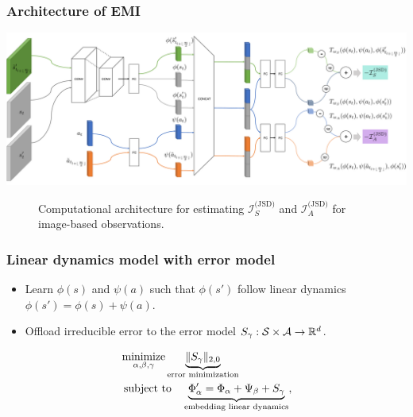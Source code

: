 \documentclass[10pt,mathserif]{beamer}
\begin{document}

\begin{frame}
\frametitle{Architecture of EMI}
  \vspace{2em}
  \hspace*{-2em} \includegraphics[width=0.95\paperwidth]{emi_figures/arch_diagram}
  \vspace{-1em}
  \begin{figure}
      \caption{Computational architecture for estimating $\mathcal{I}^{\text{(JSD)}}_S$ and $\mathcal{I}^{\text{(JSD)}}_A$ for image-based observations.}
  \end{figure}

\end{frame}


\begin{frame}
\frametitle{Linear dynamics model with error model}
\begin{itemize} \itemsep=12pt
\item Learn $\phi(s)$ and $\psi(a)$ such that $\phi(s')$ follow linear dynamics \ie~ $\phi(s') = \phi(s) + \psi(a)$.
\item Offload irreducible error to the error model $S_\gamma : \mathcal{S} \times \mathcal{A} \rightarrow \mathbb R^d$.
\end{itemize}

\begin{align}
&\operatorname*{minimize}_{\alpha, \beta, \gamma} \underbrace{\| S_\gamma \|_{2,0}}_{\text{error minimization}} \nonumber\\
&\text{\ subject to }~~ \underbrace{\Phi_{\alpha}' = \Phi_\alpha + \Psi_\beta + S_\gamma}_{\text{embedding linear dynamics}}, \nonumber
\end{align}

\end{frame}

\end{document}

